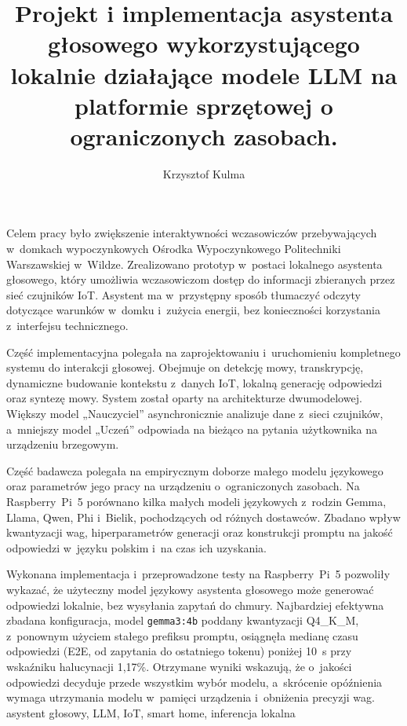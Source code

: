 \documentclass[
    a4paper,
    left=25mm,
    right=25mm,
    top=25mm,
    bottom=25mm,
    bindingoffset=5mm,
    nohyphenation=false
]{src/wut-thesis}
\begin{document}
\MasterThesis
{}
\title{
    Projekt i implementacja asystenta głosowego wykorzystującego lokalnie działające modele LLM na platformie sprzętowej o ograniczonych zasobach.
}
\author{Krzysztof Kulma}
\date{\the\year}
\maketitle

\cleardoublepage
\streszczenie Celem pracy było zwiększenie interaktywności wczasowiczów przebywających w~domkach wypoczynkowych Ośrodka Wypoczynkowego Politechniki Warszawskiej w~Wildze. Zrealizowano prototyp w~postaci lokalnego asystenta głosowego, który umożliwia wczasowiczom dostęp do informacji zbieranych przez sieć czujników IoT. Asystent ma w~przystępny sposób tłumaczyć odczyty dotyczące warunków w~domku i~zużycia energii, bez konieczności korzystania z~interfejsu technicznego.

Część implementacyjna polegała na zaprojektowaniu i~uruchomieniu kompletnego systemu do interakcji głosowej. Obejmuje on detekcję mowy, transkrypcję, dynamiczne budowanie kontekstu z~danych IoT, lokalną generację odpowiedzi oraz syntezę mowy. System został oparty na architekturze dwumodelowej. Większy model „Nauczyciel” asynchronicznie analizuje dane z~sieci czujników, a~mniejszy model „Uczeń” odpowiada na bieżąco na pytania użytkownika na urządzeniu brzegowym.

Część badawcza polegała na empirycznym doborze małego modelu językowego oraz parametrów jego pracy na urządzeniu o~ograniczonych zasobach. Na Raspberry~Pi~5 porównano kilka małych modeli językowych z~rodzin Gemma, Llama, Qwen, Phi i~Bielik, pochodzących od różnych dostawców. Zbadano wpływ kwantyzacji wag, hiperparametrów generacji oraz konstrukcji promptu na jakość odpowiedzi w~języku polskim i~na czas ich uzyskania.

Wykonana implementacja i~przeprowadzone testy na Raspberry~Pi~5 pozwoliły wykazać, że użyteczny model językowy asystenta głosowego może generować odpowiedzi lokalnie, bez wysyłania zapytań do chmury. Najbardziej efektywna zbadana konfiguracja, model \texttt{gemma3:4b} poddany kwantyzacji Q4\_K\_M, z~ponownym użyciem stałego prefiksu promptu, osiągnęła medianę czasu odpowiedzi (E2E, od zapytania do ostatniego tokenu) poniżej 10~s przy wskaźniku halucynacji 1{,}17\%. Otrzymane wyniki wskazują, że o~jakości odpowiedzi decyduje przede wszystkim wybór modelu, a~skrócenie opóźnienia wymaga utrzymania modelu w~pamięci urządzenia i~obniżenia precyzji wag.
\slowakluczowe asystent głosowy, LLM, IoT, smart home, inferencja lokalna
\end{document}
